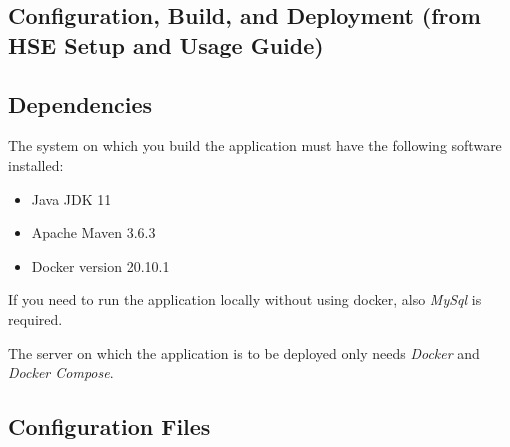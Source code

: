 \documentclass[a4paper]{usiinfbachelorproject}
\begin{document}
\newpage


\begin{appendices}

        \section{Configuration, Build, and Deployment (from HSE Setup and Usage Guide)}
        \label{sec:deployment}

        \subsection{Dependencies}

        The system on which you build the application must have the following software installed:

        \begin{itemize}

        \item Java JDK 11

        \item Apache Maven 3.6.3

        \item Docker version 20.10.1

        \end{itemize}

        If you need to run the application locally without using docker, also \emph{MySql} is required. 

        The server on which the application is to be deployed only needs \emph{Docker} and \emph{Docker Compose}.

        \subsection{Configuration Files}


\end{appendices}
\end{document}
